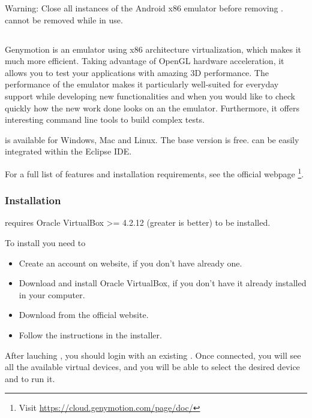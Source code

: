 Warning: Close all instances of the Android x86 emulator before removing
\intelHAXM{}. \intelHAXM{} cannot be removed while in use.

\subsection{\genymotion{}\label{sec:genymotion}}

Genymotion is an emulator using x86 architecture virtualization, which makes it much
more efficient. 
Taking advantage of OpenGL hardware acceleration, it allows you to test your
applications with amazing 3D performance.
The performance of the \genymotion{} emulator makes it  particularly well-suited
for everyday support while developing
new functionalities and when you would like to check quickly how the new work
done looks on
an the emulator.
Furthermore,
it offers interesting command line tools to build complex tests.

\genymotion{} is available for 
Windows, Mac and Linux. The base version is free.
\genymotion{} can be easily integrated within the Eclipse IDE.

For a full list of features and installation requirements, see the official
webpage%
\footnote{Visit \url{https://cloud.genymotion.com/page/doc/}}.

\subsubsection{\genymotion{} Installation}

\genymotion{} requires Oracle VirtualBox >= 4.2.12 (greater is better) to be
installed. 

To install \genymotion{} you need to 
\begin{itemize}
   \item Create an account on \genymotion{} website, if you don't have already
      one.
   \item Download and install Oracle VirtualBox, if you don't have it already
      installed in your computer.
   \item Download \genymotion{} from the official website.
   \item Follow the instructions in the installer.
\end{itemize}

After lauching \genymotion{}, you should login with an existing \genymotion{}.
Once connected, you will see all the available virtual devices, and you will be
able to select the desired device and to run it.

